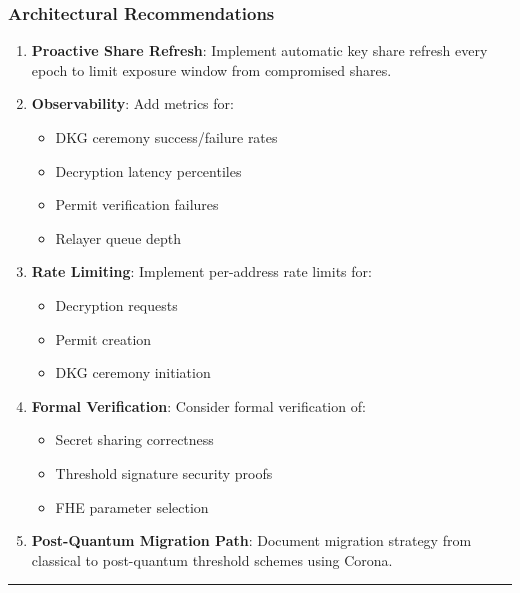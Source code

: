 \documentclass[
]{article}
\providecommand{\tightlist}{%
  \setlength{\itemsep}{0pt}\setlength{\parskip}{0pt}}
\begin{document}
\subsubsection{Architectural
Recommendations}\label{architectural-recommendations}

\begin{enumerate}
\def\labelenumi{\arabic{enumi}.}
\item
  \textbf{Proactive Share Refresh}: Implement automatic key share
  refresh every epoch to limit exposure window from compromised shares.
\item
  \textbf{Observability}: Add metrics for:

  \begin{itemize}
  \tightlist
  \item
    DKG ceremony success/failure rates
  \item
    Decryption latency percentiles
  \item
    Permit verification failures
  \item
    Relayer queue depth
  \end{itemize}
\item
  \textbf{Rate Limiting}: Implement per-address rate limits for:

  \begin{itemize}
  \tightlist
  \item
    Decryption requests
  \item
    Permit creation
  \item
    DKG ceremony initiation
  \end{itemize}
\item
  \textbf{Formal Verification}: Consider formal verification of:

  \begin{itemize}
  \tightlist
  \item
    Secret sharing correctness
  \item
    Threshold signature security proofs
  \item
    FHE parameter selection
  \end{itemize}
\item
  \textbf{Post-Quantum Migration Path}: Document migration strategy from
  classical to post-quantum threshold schemes using Corona.
\end{enumerate}

\begin{center}\rule{0.5\linewidth}{0.5pt}\end{center}
\end{document}
